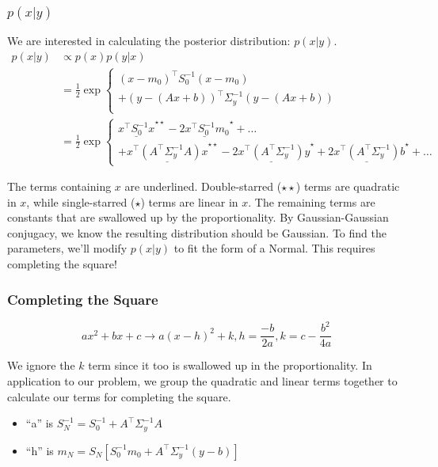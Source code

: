 \documentclass{article}
\begin{document}
\subsubsection{$p(x|y)$}
We are interested in calculating the posterior distribution: $p(x|y)$.
\begin{align*}
  p(x|y) & \propto p(x) p(y|x) \\
         & =
           \frac{1}{2} \exp \begin{cases}
             (x - m_0)^\top S_0^{-1} (x - m_0) \\
             + (y - (Ax + b))^\top \Sigma_y^{-1} (y - (Ax + b)) \\
           \end{cases} \\
         & = \frac{1}{2} \exp
           \begin{cases} 
             \underline{x^\top S_0^{-1} x}^{\star \star} - \underline{2x^\top S_0^{-1} m_0}^{\star} + \ldots \\
             + \underline{x^\top (A^\top \Sigma_y^{-1}A)x}^{\star \star} - \underline{2x^\top(A^\top\Sigma_y^{-1})y}^{\star} + \underline{2x^\top(A^\top\Sigma_y^{-1})b}^{\star} + \ldots
           \end{cases}
\end{align*}

The terms containing $x$ are underlined. Double-starred ($\star \star$) terms are quadratic in $x$, while single-starred ($\star$) terms are linear in $x$. The remaining terms are constants that are swallowed up by the proportionality. By Gaussian-Gaussian conjugacy, we know the resulting distribution should be Gaussian. To find the parameters, we'll modify $p(x|y)$ to fit the form of a Normal. This requires completing the square!

\subsubsection{Completing the Square}

$$ax^2 + bx + c \to a(x - h)^2 + k, h = \frac{-b}{2a}, k = c - \frac{b^2}{4a}$$

We ignore the $k$ term since it too is swallowed up in the proportionality. In application to our problem, we group the quadratic and linear terms together to calculate our terms for completing the square.

\begin{itemize}
\item ``a'' is $S_N^{-1} = S_0^{-1} + A^\top \Sigma_y^{-1}A$
\item ``h'' is $m_N = S_N \left[S_0^{-1}m_0 + A^\top \Sigma_y^{-1}(y - b)\right]$
\end{itemize}
\end{document}

